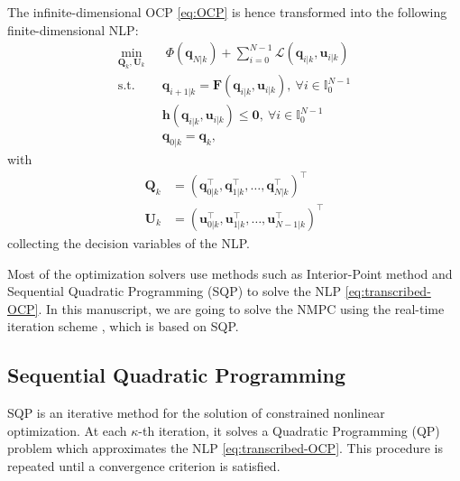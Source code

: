 The infinite-dimensional OCP \eqref{eq:OCP} is hence transformed into the 
following finite-dimensional NLP:
\begin{equation}
    \label{eq:transcribed-OCP}
    \begin{aligned}
        \min_{\bm{Q}_k, \bm{U}_k} \;\;
            & \; \Phi(\bm{q}_{N|k}) + \sum_{i=0}^{N-1} \mathcal{L}(\bm{q}_{i|k}, \bm{u}_{i|k}) \\
            \text{s.t. } & \bm{q}_{i+1|k} = \bm{F}(\bm{q}_{i|k}, \bm{u}_{i|k}), \ \forall i \in \mathbb{I}_{0}^{N-1} \\
                         & \bm{h}(\bm{q}_{i|k}, \bm{u}_{i|k}) \le \bm{0}, \ \forall i \in \mathbb{I}_{0}^{N-1} \\
                         & \bm{q}_{0|k} = \bm{q}_k,
    \end{aligned}
\end{equation}
with
\begin{align*}
\bm{Q}_k &= (\bm{q}_{0|k}^\top, \bm{q}_{1|k}^\top, \dots, \bm{q}_{N|k}^\top)^\top \\
\bm{U}_k &= (\bm{u}_{0|k}^\top, \bm{u}_{1|k}^\top, \dots, \bm{u}_{N-1|k}^\top)^\top
\end{align*}
collecting the decision variables of the NLP.

Most of the optimization solvers use methods such as Interior-Point method and 
Sequential Quadratic Programming (SQP) \cite{Nocedal2006NumericalOptimization}
to solve the NLP \eqref{eq:transcribed-OCP}. In this manuscript, we are 
going to solve the NMPC using the real-time iteration scheme
\cite{Gros2020Fromlineartononlinear}, which is based on SQP.

\subsection{Sequential Quadratic Programming}
SQP is an iterative method for the solution of constrained nonlinear 
optimization. At each $\kappa$-th iteration, it solves a Quadratic Programming (QP)
problem which approximates the NLP \eqref{eq:transcribed-OCP}.
This procedure is repeated until a convergence criterion is satisfied.

